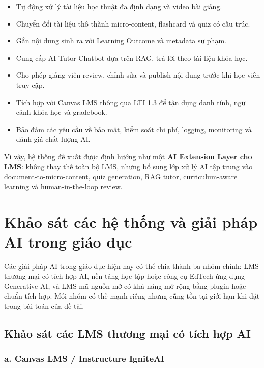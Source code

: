 \begin{itemize}
    \item Tự động xử lý tài liệu học thuật đa định dạng và video bài giảng.
    \item Chuyển đổi tài liệu thô thành micro-content, flashcard và quiz có
          cấu trúc.
    \item Gắn nội dung sinh ra với Learning Outcome và metadata sư phạm.
    \item Cung cấp AI Tutor Chatbot dựa trên RAG, trả lời theo tài liệu khóa
          học.
    \item Cho phép giảng viên review, chỉnh sửa và publish nội dung trước khi
          học viên truy cập.
    \item Tích hợp với Canvas LMS thông qua LTI 1.3 để tận dụng danh tính, ngữ
          cảnh khóa học và gradebook.
    \item Bảo đảm các yêu cầu về bảo mật, kiểm soát chi phí, logging,
          monitoring và đánh giá chất lượng AI.
\end{itemize}

Vì vậy, hệ thống đề xuất được định hướng như một \textbf{AI Extension Layer cho
LMS}: không thay thế toàn bộ LMS, nhưng bổ sung lớp xử lý AI tập trung vào
document-to-micro-content, quiz generation, RAG tutor, curriculum-aware
learning và human-in-the-loop review.

\section{Khảo sát các hệ thống và giải pháp AI trong giáo dục}
\label{sec:khao-sat-giai-phap-ai-giao-duc}

Các giải pháp AI trong giáo dục hiện nay có thể chia thành ba nhóm chính: LMS
thương mại có tích hợp AI, nền tảng học tập hoặc công cụ EdTech ứng dụng
Generative AI, và LMS mã nguồn mở có khả năng mở rộng bằng plugin hoặc chuẩn
tích hợp. Mỗi nhóm có thế mạnh riêng nhưng cũng tồn tại giới hạn khi đặt trong
bài toán của đề tài.

\subsection{Khảo sát các LMS thương mại có tích hợp AI}

\subsubsection*{a. Canvas LMS / Instructure IgniteAI}

